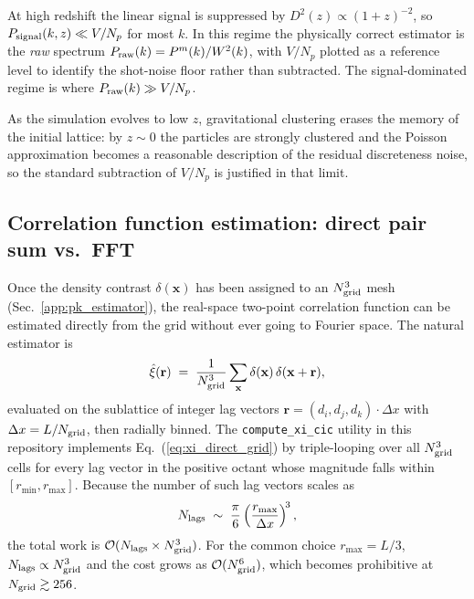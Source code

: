\documentclass[12pt]{article}
\newcommand{\bx}{\mathbf{x}}
\newcommand{\br}{\mathbf{r}}
\begin{document}
At high redshift the linear signal is suppressed by $D^2(z)
\propto (1+z)^{-2}$, so $P_{\rm signal}(k,z) \ll V/N_p$ for most
$k$.  In this regime the physically correct estimator is the
\emph{raw} spectrum $P_{\rm raw}(k) = P^m(k)/W^2(k)$, with $V/N_p$
plotted as a reference level to identify the shot-noise floor rather
than subtracted.  The signal-dominated regime is where
$P_{\rm raw}(k) \gg V/N_p$.

As the simulation evolves to low $z$, gravitational clustering erases
the memory of the initial lattice: by $z\sim 0$ the particles are
strongly clustered and the Poisson approximation becomes a reasonable
description of the residual discreteness noise, so the standard
subtraction of $V/N_p$ is justified in that limit.

\subsection{Correlation function estimation: direct pair sum vs.\ FFT}
\label{sec:xi_estimator}

Once the density contrast $\delta(\bx)$ has been assigned to an
$N_{\rm grid}^3$ mesh (Sec.~\ref{app:pk_estimator}), the real-space
two-point correlation function can be estimated directly from the grid
without ever going to Fourier space.  The natural estimator is
%
\begin{equation}
  \hat\xi(\br) \;=\;
    \frac{1}{N_{\rm grid}^3} \sum_{\bx}
      \delta(\bx)\,\delta(\bx+\br),
  \label{eq:xi_direct_grid}
\end{equation}
%
evaluated on the sublattice of integer lag vectors $\br = (d_i,d_j,d_k)
\cdot \Delta x$ with $\Delta x = L/N_{\rm grid}$, then radially binned.
The \texttt{compute\_xi\_cic} utility in this repository implements
Eq.~(\ref{eq:xi_direct_grid}) by triple-looping over all
$N_{\rm grid}^3$ cells for every lag vector in the positive octant whose
magnitude falls within $[r_{\min}, r_{\max}]$.  Because the number of
such lag vectors scales as
%
\begin{equation}
  N_{\rm lags} \;\sim\;
    \frac{\pi}{6}\left(\frac{r_{\max}}{\Delta x}\right)^{\!3},
\end{equation}
%
the total work is $\mathcal{O}(N_{\rm lags}\times N_{\rm grid}^3)$.  For
the common choice $r_{\max} = L/3$, $N_{\rm lags} \propto
N_{\rm grid}^3$ and the cost grows as $\mathcal{O}(N_{\rm grid}^6)$,
which becomes prohibitive at $N_{\rm grid} \gtrsim 256$.
\end{document}
